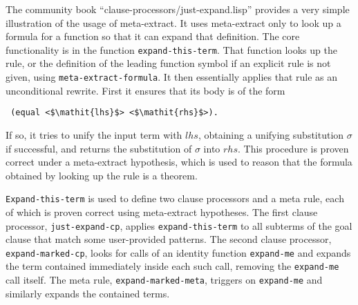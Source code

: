 The community book ``clause-processors/just-expand.lisp'' provides a
very simple illustration of the usage of meta-extract.  It uses
meta-extract only to look up a formula for a function so that it can
expand that definition.  The core functionality is in the function
\texttt{expand-this-term}.  That function looks up the rule, or the
definition of the leading function symbol if an explicit rule is not
given, using \texttt{meta-extract-formula}.  It then essentially
applies that rule as an unconditional rewrite.  First it ensures that
its body is of the form
\begin{lstlisting}
 (equal <$\mathit{lhs}$> <$\mathit{rhs}$>).
\end{lstlisting}
If so, it tries to unify the input term with $\mathit{lhs}$, obtaining
a unifying substitution $\sigma$ if successful, and returns the
substitution of $\sigma$ into $\mathit{rhs}$.  This procedure is proven
correct under a meta-extract hypothesis, which is used to reason that
the formula obtained by looking up the rule is a theorem.

\texttt{Expand-this-term} is used to define two clause processors and
a meta rule, each of which is proven correct using meta-extract
hypotheses.  The first clause processor, \texttt{just-expand-cp},
applies \texttt{expand-this-term} to all subterms of the goal clause
that match some user-provided patterns.  The second clause processor,
\texttt{expand-marked-cp}, looks for calls of an identity function
\texttt{expand-me} and expands the term contained immediately inside
each such call, removing the \texttt{expand-me} call itself.  The meta
rule, \texttt{expand-marked-meta}, triggers on \texttt{expand-me} and
similarly expands the contained terms.

\begin{comment}
  Sol, it would be interesting to know why, for the two
  clause-processors above, you used meta-extract rather than just
  making computed hints (or override hints) that :expand suitable
  terms.  I {\em do} see why computed hints wouldn't suffice if you
  were talking about metafunctions instead of clause-processors, since
  terms to be expanded can arise during rewriting.

  [Sol] One place it's used is in a hint that inducts and then
  immediately expands the calls of the given function in the induction
  conclusion but not the induction hyps.  I'm not sure how deep we
  need to go with motivation for each of these so I'm not sure if I
  should say anything about it in the paper.

  [Matt] Hmmm, but your description doesn't make it clear to me where
  the expand-me calls come from when using expand-marked-meta to
  expand certain terms produced by induction.  I agree with your
  general uncertainty about the value of saying much about
  expand-marked-meta, but as a reader I'd like to get just a quick
  sense of the flow that results in its application.
\end{comment}

